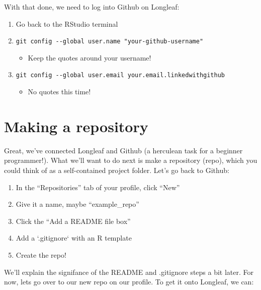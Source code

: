 \documentclass[
  letterpaper,
  DIV=11,
  numbers=noendperiod]{scrreprt}
\providecommand{\tightlist}{%
  \setlength{\itemsep}{0pt}\setlength{\parskip}{0pt}}\usepackage{longtable,booktabs,array}
\begin{document}
With that done, we need to log into Github on Longleaf:

\begin{enumerate}
\def\labelenumi{\arabic{enumi}.}
\item
  Go back to the RStudio terminal
\item
  \texttt{git\ config\ -\/-global\ user.name\ "your-github-username"}

  \begin{itemize}
  \tightlist
  \item
    Keep the quotes around your username!
  \end{itemize}
\item
  \texttt{git\ config\ -\/-global\ user.email\ your.email.linkedwithgithub}

  \begin{itemize}
  \tightlist
  \item
    No quotes this time!
  \end{itemize}
\end{enumerate}

\hypertarget{sec-repo}{%
\section{Making a repository}\label{sec-repo}}

Great, we've connected Longleaf and Github (a herculean task for a
beginner programmer!). What we'll want to do next is make a repository
(repo), which you could think of as a self-contained project folder.
Let's go back to Github:

\begin{enumerate}
\def\labelenumi{\arabic{enumi}.}
\item
  In the ``Repositories'' tab of your profile, click ``New''
\item
  Give it a name, maybe ``example\_repo''
\item
  Click the ``Add a README file box''
\item
  Add a `.gitignore` with an R template
\item
  Create the repo!
\end{enumerate}

We'll explain the signifance of the README and .gitignore steps a bit
later. For now, lets go over to our new repo on our profile. To get it
onto Longleaf, we can:
\end{document}
